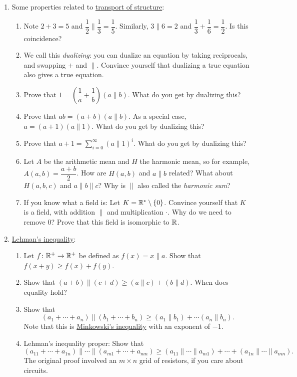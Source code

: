 \documentclass[11pt,paper=letter]{scrartcl}
\newcommand{\pl}{\parallel}
\begin{document}
\begin{enumerate}
\item Some properties related to \href{https://en.wikipedia.org/wiki/Transport_of_structure}{transport of structure}:
\begin{enumerate}[label*=\arabic*]
\item Note $2 + 3 = 5$ and $\dfrac{1}{2} \pl \dfrac{1}{3} = \dfrac{1}{5}$. Similarly, $3 \pl 6 = 2$ and $\dfrac{1}{3} + \dfrac{1}{6} = \dfrac{1}{2}$. Is this coincidence?
\item We call this \textit{dualizing}: you can dualize an equation by taking reciprocals, and swapping $+$ and $\pl$. Convince yourself that dualizing a true equation also gives a true equation.
\item Prove that $1 = \left(\dfrac{1}{a} + \dfrac{1}{b}\right)(a \pl b)$. What do you get by dualizing this?
\item \label{p:sum-product-identity} Prove that $ab = (a + b)(a \pl b)$. As a special case, $a = (a + 1)(a \pl 1)$. What do you get by dualizing this?
\item \label{p:infinite-series} Prove that $\displaystyle a + 1 = \sum_{i = 0}^{\infty} (a \pl 1)^i$. What do you get by dualizing this?
\item Let $A$ be the arithmetic mean and $H$ the harmonic mean, so for example, $A(a, b) = \dfrac{a + b}{2}$. How are $H(a, b)$ and $a \pl b$ related? What about $H(a, b, c)$ and $a \pl b \pl c$? Why is $\pl$ also called the \textit{harmonic sum}?
\item \label{p:field} If you know what a field is: Let $K = \mathbb R^* \setminus \{0\}$. Convince yourself that $K$ is a field, with addition $\pl$ and multiplication $\cdot$. Why do we need to remove $0$? Prove that this field is isomorphic to $\mathbb R$.
\end{enumerate}

\item \href{https://www.johndcook.com/blog/2023/07/06/lehmans-inequality-circuits-and-latex/}{Lehman's inequality}:
\begin{enumerate}[label*=\arabic*]
\item \label{p:lehman1} Let $f \colon \mathbb R^+ \to \mathbb R^+$ be defined as $f(x) = x \pl a$. Show that $f(x + y) \ge f(x) + f(y)$.
\item Show that $(a + b) \pl (c + d) \ge (a \pl c) + (b \pl d)$. When does equality hold?
\item Show that \[
  (a_1 + \cdots + a_n) \pl (b_1 + \cdots + b_n) \ge (a_1 \pl b_1) + \cdots (a_n \pl b_n).
\]
Note that this is \href{https://en.wikipedia.org/wiki/Minkowski_inequality}{Minkowski's inequality} with an exponent of $-1$.
\item Lehman's inequality proper: Show that \[
  (a_{11} + \cdots + a_{1n}) \pl \cdots \pl (a_{m1} + \cdots + a_{mn})
  \ge (a_{11} \pl \cdots \pl a_{m1}) + \cdots + (a_{1n} \pl \cdots \pl a_{mn}).
\]
The original proof involved an $m \times n$ grid of resistors, if you care about circuits.
\end{enumerate}


\end{enumerate}
\end{document}
